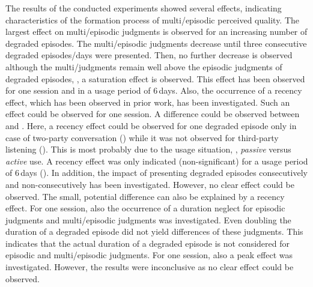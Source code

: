 The results of the conducted experiments showed several effects, indicating characteristics of the formation process of multi\-/episodic perceived quality.
The largest effect on multi\-/episodic judgments is observed for an increasing number of degraded episodes.
The multi\-/episodic judgments decrease until three consecutive degraded episodes/days were presented.
Then, no further decrease is observed although the multi\-/judgments remain well above the episodic judgments of degraded episodes, \ie, a saturation effect is observed.
This effect has been observed for one session and in a usage period of 6\,days.
Also, the occurrence of a recency effect, which has been observed in prior work, has been investigated.
Such an effect could be observed for one session.
A difference could be observed between  and \EIIa{}.
Here, a recency effect could be observed for one degraded episode only in case of two-party conversation () while it was not observed for third-party listening (\EIIa{}).
This is most probably due to the usage situation, \ie, \emph{passive} versus \emph{active} use.
A recency effect was only indicated (non-significant) for a usage period of 6\,days  ().
In addition, the impact of presenting degraded episodes consecutively and non-consecutively has been investigated.
However, no clear effect could be observed.
The small, potential difference can also be explained by a recency effect.
For one session, also the occurrence of a duration neglect for episodic judgments and multi\-/episodic judgments was investigated.
Even doubling the duration of a degraded episode did not yield differences of these judgments.
This indicates that the actual duration of a degraded episode is not considered for episodic and multi\-/episodic judgments.
For one session, also a peak effect was investigated.
However, the results were inconclusive as no clear effect could be observed.

